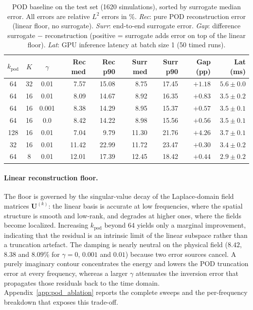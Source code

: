 ﻿\documentclass[a4paper,12pt]{article}
\theoremstyle{definition}
\theoremstyle{remark}
\begin{document}
\begin{table}[htbp]
    \centering
    \small
    \setlength{\tabcolsep}{4pt}
    \renewcommand{\arraystretch}{1.3}
    \begin{tabular}{cccrrrrrr}
        \toprule
        $k_{\mathrm{pod}}$ & $K$ & $\gamma$
            & \textbf{Rec med} & \textbf{Rec p90}
            & \textbf{Surr med} & \textbf{Surr p90}
            & \textbf{Gap (pp)} & \textbf{Lat (ms)} \\
        \midrule
         64 & 32 & 0.01  &  7.57 & 15.08 &  8.75 & 17.45 & $+1.18$ & $5.6 \pm 0.0$ \\
         64 & 16 & 0.01  &  8.09 & 14.67 &  8.92 & 16.35 & $+0.83$ & $3.5 \pm 0.2$ \\
         64 & 16 & 0.001 &  8.38 & 14.29 &  8.95 & 15.37 & $+0.57$ & $3.5 \pm 0.1$ \\
         64 & 16 & 0.0   &  8.42 & 14.22 &  8.98 & 15.56 & $+0.56$ & $3.5 \pm 0.1$ \\
        128 & 16 & 0.01  &  7.04 &  9.79 & 11.30 & 21.76 & $+4.26$ & $3.7 \pm 0.1$ \\
         32 & 16 & 0.01  & 11.42 & 22.99 & 11.72 & 23.47 & $+0.30$ & $3.4 \pm 0.2$ \\
         64 &  8 & 0.01  & 12.01 & 17.39 & 12.45 & 18.42 & $+0.44$ & $2.9 \pm 0.2$ \\
        \bottomrule
    \end{tabular}
    \caption{POD baseline on the test set (1620 simulations), sorted by surrogate median error. All errors are relative $L^2$ errors in \%. \emph{Rec}: pure POD reconstruction error (linear floor, no surrogate). \emph{Surr}: end-to-end surrogate error. \emph{Gap}: difference surrogate $-$ reconstruction (positive = surrogate adds error on top of the linear floor). \emph{Lat}: GPU inference latency at batch size 1 (50 timed runs).}
    \label{tab:pod_surr_results}
\end{table}

\paragraph{Linear reconstruction floor.}
The floor is governed by the singular-value decay of the Laplace-domain field matrices $\bm{U}^{(k)}$: the linear basis is accurate at low frequencies, where the spatial structure is smooth and low-rank, and degrades at higher ones, where the fields become localized. Increasing $k_{\mathrm{pod}}$ beyond $64$ yields only a marginal improvement, indicating that the residual is an intrinsic limit of the linear subspace rather than a truncation artefact. The damping is nearly neutral on the physical field ($8.42$, $8.38$ and $8.09$\% for $\gamma = 0$, $0.001$ and $0.01$) because two error sources cancel. A purely imaginary contour concentrates the energy and lowers the POD truncation error at every frequency, whereas a larger $\gamma$ attenuates the inversion error that propagates those residuals back to the time domain. Appendix~\ref{app:pod_ablation} reports the complete sweeps and the per-frequency breakdown that exposes this trade-off.
\end{document}
